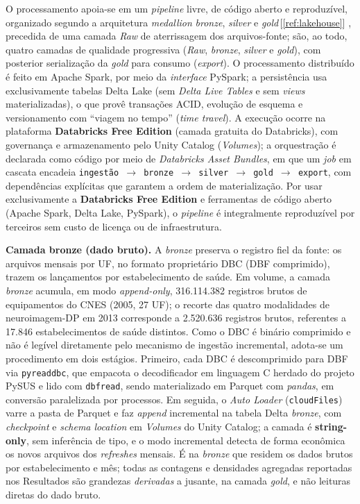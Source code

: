\documentclass[12pt,a4paper,oneside]{article}
\begin{document}
O processamento apoia-se em um \textit{pipeline} livre, de código
aberto e reproduzível, organizado segundo a arquitetura
\textit{medallion} \textemdash{} \textit{bronze}, \textit{silver} e
\textit{gold}\,[\ref{ref:lakehouse}] \textemdash{}, precedida de uma
camada \textit{Raw} de aterrissagem dos arquivos-fonte; são, ao todo,
quatro camadas de qualidade progressiva (\textit{Raw}, \textit{bronze},
\textit{silver} e \textit{gold}), com posterior serialização da
\textit{gold} para consumo (\textit{export}). O processamento distribuído é
feito em Apache Spark, por meio da \textit{interface} PySpark; a
persistência usa exclusivamente tabelas Delta Lake (sem \textit{Delta
Live Tables} e sem \textit{views} materializadas), o que provê
transações ACID, evolução de esquema e versionamento com ``viagem no
tempo'' (\textit{time travel}). A execução ocorre na plataforma
\textbf{Databricks Free Edition} (camada gratuita do Databricks), com
governança e armazenamento pelo Unity Catalog (\textit{Volumes}); a
orquestração é declarada como código por meio de \textit{Databricks
Asset Bundles}, em que um \textit{job} em cascata encadeia
\texttt{ingestão $\rightarrow$ bronze $\rightarrow$ silver
$\rightarrow$ gold $\rightarrow$ export}, com dependências explícitas
que garantem a ordem de materialização. Por usar exclusivamente a
\textbf{Databricks Free Edition} e ferramentas de código aberto (Apache
Spark, Delta Lake, PySpark), o \textit{pipeline} é integralmente
reproduzível por terceiros sem custo de licença ou de infraestrutura.

\textbf{Camada bronze (dado bruto).} A \textit{bronze} preserva o
registro fiel da fonte: os arquivos mensais por UF, no formato
proprietário DBC (DBF comprimido), trazem os lançamentos por
estabelecimento de saúde. Em volume, a camada \textit{bronze} acumula,
em modo \textit{append-only}, 316.114.382 registros brutos de
equipamentos do CNES (2005, 27 UF); o recorte das
quatro modalidades de neuroimagem-DP em 2013
corresponde a 2.520.636 registros brutos, referentes a 17.846
estabelecimentos de saúde distintos. Como o DBC é binário comprimido e não é
legível diretamente pelo mecanismo de ingestão incremental, adota-se um
procedimento em dois estágios. Primeiro, cada DBC é descomprimido para
DBF \textemdash{} via \texttt{pyreaddbc}, que empacota o decodificador
em linguagem C herdado do projeto PySUS \textemdash{} e lido com
\texttt{dbfread}, sendo materializado em Parquet com \textit{pandas},
em conversão paralelizada por processos. Em seguida, o \textit{Auto
Loader} (\texttt{cloudFiles}) varre a pasta de Parquet e faz
\textit{append} incremental na tabela Delta \textit{bronze}, com
\textit{checkpoint} e \textit{schema location} em \textit{Volumes} do
Unity Catalog; a camada é \textbf{string-only}, sem inferência de tipo,
e o modo incremental detecta de forma econômica os novos arquivos dos
\textit{refreshes} mensais. É na \textit{bronze} que residem os dados
brutos por estabelecimento e mês; todas as contagens e densidades
agregadas reportadas nos Resultados são grandezas \textit{derivadas} a
jusante, na camada \textit{gold}, e não leituras diretas do dado bruto.
\end{document}
